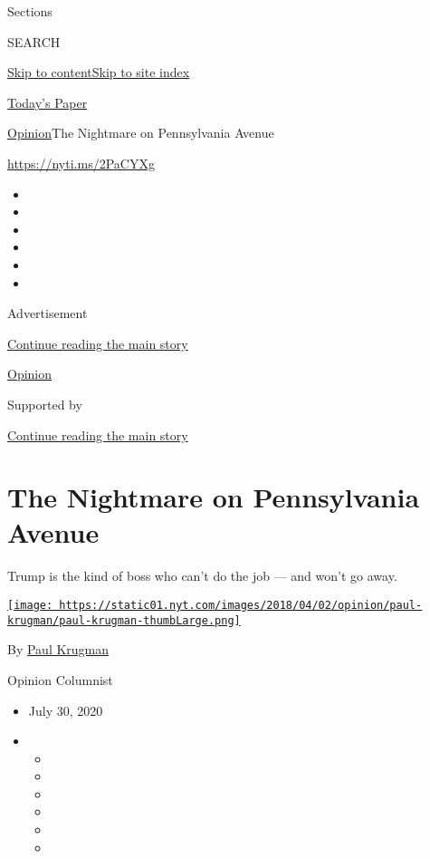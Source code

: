 Sections

SEARCH

\protect\hyperlink{site-content}{Skip to
content}\protect\hyperlink{site-index}{Skip to site index}

\href{https://myaccount.nytimes.com/auth/login?response_type=cookie\&client_id=vi}{}

\href{https://www.nytimes.com/section/todayspaper}{Today's Paper}

\href{/section/opinion}{Opinion}\textbar{}The Nightmare on Pennsylvania
Avenue

\url{https://nyti.ms/2PaCYXg}

\begin{itemize}
\item
\item
\item
\item
\item
\item
\end{itemize}

Advertisement

\protect\hyperlink{after-top}{Continue reading the main story}

\href{/section/opinion}{Opinion}

Supported by

\protect\hyperlink{after-sponsor}{Continue reading the main story}

\hypertarget{the-nightmare-on-pennsylvania-avenue}{%
\section{The Nightmare on Pennsylvania
Avenue}\label{the-nightmare-on-pennsylvania-avenue}}

Trump is the kind of boss who can't do the job --- and won't go away.

\href{https://www.nytimes.com/by/paul-krugman}{\texttt{[image: https://static01.nyt.com/images/2018/04/02/opinion/paul-krugman/paul-krugman-thumbLarge.png]}}

By \href{https://www.nytimes.com/by/paul-krugman}{Paul Krugman}

Opinion Columnist

\begin{itemize}
\item
  July 30, 2020
\item
  \begin{itemize}
  \item
  \item
  \item
  \item
  \item
  \item
  \end{itemize}
\end{itemize}

